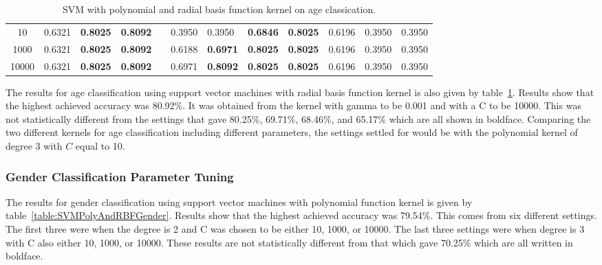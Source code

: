 \documentclass[a4paper]{llncs}
\begin{document}
\begin{table}[!htbp]
\begin{tabular}{|c|lll|l|lllllll|}
10                 & 0.6321                 & \textbf{0.8025}        & \textbf{0.8092}        &                       & 0.3950                      & 0.3950                     & \textbf{0.6846}          & \textbf{0.8025}        & 0.6196                  & 0.3950                    & 0.3950                     \\ %
1000               & 0.6321                 & \textbf{0.8025}        & \textbf{0.8092}        &                       & 0.6188                      & \textbf{0.6971}            & \textbf{0.8025}          & \textbf{0.8025}        & 0.6196                  & 0.3950                    & 0.3950                     \\ %
10000              & 0.6321                 & \textbf{0.8025}        & \textbf{0.8092}        &                       & 0.6971                      & \textbf{0.8092}            & \textbf{0.8025}          & \textbf{0.8025}        & 0.6196                  & 0.3950                    & 0.3950                     \\ \cline{1-4} \cline{6-12} 
\end{tabular}
\caption{SVM with polynomial and radial basis function kernel on age classication.}
\label{table:SVMPolyAndRBFAge}
\end{table}


The results for age classification using support vector machines with radial basis function kernel is also given by table~\ref{table:SVMPolyAndRBFAge}. Results show that the highest achieved accuracy was 80.92\%. It was obtained from the kernel with gamma to be 0.001 and with a C to be 10000. This was not statistically different from the settings that gave 80.25\%, 69.71\%, 68.46\%, and 65.17\% which are all shown in boldface. Comparing the two different kernels for age classification including different parameters, the settings settled for would be with the polynomial kernel of degree 3 with $C$ equal to 10.

  
\subsubsection{Gender Classification Parameter Tuning} 
The results for gender classification using support vector machines with polynomial function kernel is given by table~\ref{table:SVMPolyAndRBFGender}. Results show  that the highest achieved accuracy was 79.54\%. This comes from six different settings. The first three were when the degree is 2 and C was chosen to be either 10, 1000, or 10000. The last three settings were when degree is 3 with C also either 10, 1000, or 10000. These results are not statistically different from that which gave 70.25\% which are all written in boldface. 
\end{document}
